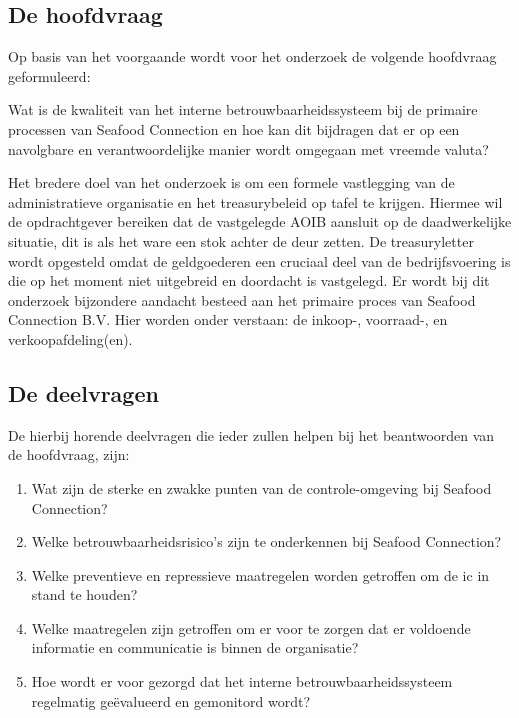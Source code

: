 \newpage

\subsection{De hoofdvraag}
Op basis van het voorgaande wordt voor het onderzoek de volgende hoofdvraag geformuleerd:

\bigskip

\noindent
\begin{center}
{\large{Wat is de kwaliteit van het interne betrouwbaarheidssysteem bij de primaire processen van Seafood Connection en hoe kan dit bijdragen dat er op een navolgbare en verantwoordelijke manier wordt omgegaan met vreemde valuta?}} 
\end{center}

\bigskip

Het bredere doel van het onderzoek is om een formele vastlegging van de administratieve organisatie en het treasurybeleid op tafel te krijgen. Hiermee wil de opdrachtgever bereiken dat de vastgelegde AOIB aansluit op de daadwerkelijke situatie, dit is als het ware een stok achter de deur zetten. De \gls{treasuryletter} wordt opgesteld omdat de \gls{geldgoederen} een cruciaal deel van de bedrijfsvoering is die op het moment niet uitgebreid en doordacht is vastgelegd. Er wordt bij dit onderzoek bijzondere aandacht besteed aan het primaire proces van Seafood Connection B.V. Hier worden onder verstaan: de inkoop-, voorraad-, en verkoopafdeling(en). 

\subsection{De deelvragen}
De hierbij horende deelvragen die ieder zullen helpen bij het beantwoorden van de hoofdvraag, zijn:

\begin{enumerate}
    \item Wat zijn de sterke en zwakke punten van de controle-omgeving bij Seafood Connection?
    \item Welke betrouwbaarheidsrisico's zijn te onderkennen bij Seafood Connection?
    \item Welke preventieve en repressieve maatregelen worden getroffen om de \gls{ic} in stand te houden?
    \item Welke maatregelen zijn getroffen om er voor te zorgen dat er voldoende informatie en communicatie is binnen de organisatie?
    \item Hoe wordt er voor gezorgd dat het interne betrouwbaarheidssysteem regelmatig geëvalueerd en gemonitord wordt?
\end{enumerate}


